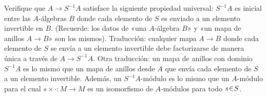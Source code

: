 \setcounter{neje}{3}
\begin{nejer}
Verifique que $A \to S^{-1}A$ satisface la siguiente propiedad universal: $S^{-1}A$ es inicial entre las $A$-álgebras $B$ donde cada elemento de $S$ es enviado a un elemento invertible en $B$. (Recuerde: los datos de «una $A$-álgebra $B$» y «un mapa de anillos $A \to B$» son los mismos). Traducción: cualquier mapa $A \to B$ donde cada elemento de $S$ se envía a un elemento invertible debe factorizarse de manera única a través de $A \to S^{-1}A$. Otra traducción: un mapa de anillos con dominio $S^{-1}A$ es lo mismo que un mapa de anillos desde $A$ que envía cada elemento de $S$ a un elemento invertible. Además, un $S^{-1}A$-módulo es lo mismo que un $A$-módulo para el cual $s \times \cdot \colon M \to M$ es un isomorfismo de $A$-módulos para todo $s \en S$.
\end{nejer}
